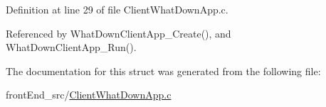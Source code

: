 Definition at line 29 of file Client\+What\+Down\+App.\+c.



Referenced by What\+Down\+Client\+App\+\_\+\+Create(), and What\+Down\+Client\+App\+\_\+\+Run().



The documentation for this struct was generated from the following file\+:\begin{DoxyCompactItemize}
\item 
front\+End\+\_\+src/\hyperlink{ClientWhatDownApp_8c}{Client\+What\+Down\+App.\+c}\end{DoxyCompactItemize}
